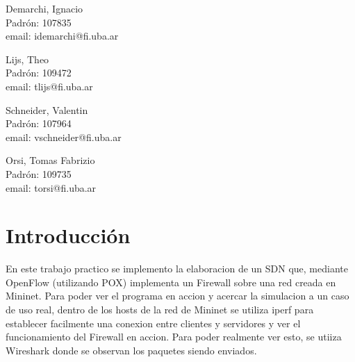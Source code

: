 \documentclass{article}
\begin{document}
\begin{titlepage}
\begin{center}
    {\begin{minipage}{.5\textwidth}
        \begin{center}
          Demarchi, Ignacio\\
          {\small{Padrón: 107835}}\\
          {\small{email: idemarchi@fi.uba.ar}}\\
        \end{center}
      \end{minipage}\begin{minipage}{.5\textwidth}
        \begin{center}
          Lijs, Theo\\
          {\small{Padrón: 109472}}\\
          {\small{email: tlijs@fi.uba.ar}}
        \end{center}
      \end{minipage}}

    \vspace{1.0cm}

    {\begin{minipage}{.5\textwidth}
        \begin{center}
          Schneider, Valentin\\
          {\small{Padrón: 107964}}\\
          {\small{email: vschneider@fi.uba.ar}}\\
        \end{center}
      \end{minipage}\begin{minipage}{.5\textwidth}
        \begin{center}
          Orsi, Tomas Fabrizio\\
          {\small{Padrón: 109735}}\\
          {\small{email: torsi@fi.uba.ar}}
        \end{center}
      \end{minipage}}

  \end{center}
\end{titlepage}

\tableofcontents
\pagebreak

\section{Introducción}\label{introducciuxf3n}

En este trabajo practico se implemento la elaboracion de un SDN que, mediante OpenFlow (utilizando POX) implementa un Firewall sobre una red creada en Mininet.
Para poder ver el programa en accion y acercar la simulacion a un caso de uso real,
dentro de los hosts de la red de Mininet se utiliza iperf para establecer facilmente
una conexion entre clientes y servidores y ver el funcionamiento del Firewall en accion.
Para poder realmente ver esto, se utiiza Wireshark donde se observan los paquetes siendo enviados.
\end{document}

